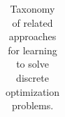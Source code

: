 \begin{table}[htbp]
\begin{tabular}{|p{2.6cm}|p{4.2cm}|p{2.8cm}|p{4.6cm}|}

\end{tabular}
\caption{Taxonomy of related approaches for learning to solve discrete optimization problems.}
\label{tab:lit_review_co_mrf_merged}
\end{table}